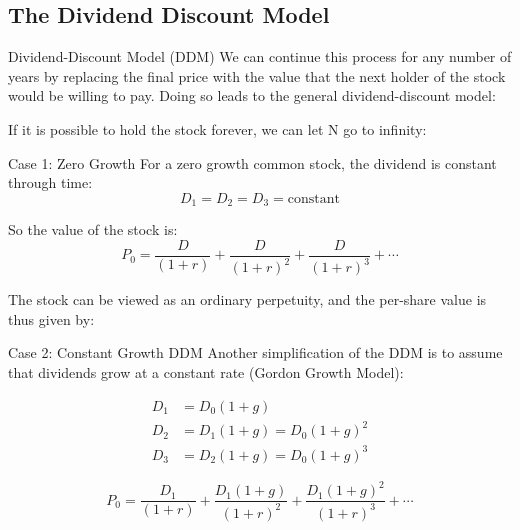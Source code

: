 \documentclass[9pt,aspectratio=169]{beamer}
\begin{document}
\subsection{The Dividend Discount Model}
\begin{frame}{Dividend-Discount Model (DDM)}
We can continue this process for any number of years by replacing the final price with the
value that the next holder of the stock would be willing to pay. Doing so leads to the
general dividend-discount model:

\vspace{0.5cm}
\begin{center}
\end{center}

\vspace{0.5cm}
If it is possible to hold the stock forever, we can let N go to infinity:

\begin{center}
\end{center}
\end{frame}

\begin{frame}{Case 1: Zero Growth}
For a zero growth common stock, the dividend is constant through time:
$$D_1 = D_2 = D_3 = \text{constant}$$

So the value of the stock is:
$$P_0 = \frac{D}{(1+r)} + \frac{D}{(1+r)^2} + \frac{D}{(1+r)^3} + \cdots$$

The stock can be viewed as an ordinary perpetuity, and the per-share value is thus given
by:

\vspace{0.2cm}
\begin{center}
\end{center}
\end{frame}

\begin{frame}{Case 2: Constant Growth DDM}
Another simplification of the DDM is to assume that dividends grow at a constant rate
(Gordon Growth Model):

\begin{align}\nonumber
D_1 &= D_0(1 + g) \\[2pt]\nonumber
D_2 &= D_1(1 + g) = D_0(1 + g)^2 \\[2pt]\nonumber
D_3 &= D_2(1 + g) = D_0(1 + g)^3
\end{align}

$$P_0 = \frac{D_1}{(1+r)} + \frac{D_1(1+g)}{(1+r)^2} + \frac{D_1(1+g)^2}{(1+r)^3} + \cdots$$
\vspace{0.2cm}
\begin{center}
\end{center}
\end{frame}
\end{document}
